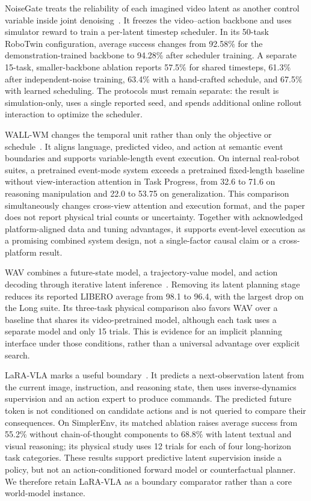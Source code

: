 NoiseGate treats the reliability of each imagined video latent as another control variable inside joint denoising~\cite{huang2026noisegate}. It freezes the video--action backbone and uses simulator reward to train a per-latent timestep scheduler. In its 50-task RoboTwin configuration, average success changes from 92.58\% for the demonstration-trained backbone to 94.28\% after scheduler training. A separate 15-task, smaller-backbone ablation reports 57.5\% for shared timesteps, 61.3\% after independent-noise training, 63.4\% with a hand-crafted schedule, and 67.5\% with learned scheduling. The protocols must remain separate: the result is simulation-only, uses a single reported seed, and spends additional online rollout interaction to optimize the scheduler.

WALL-WM changes the temporal unit rather than only the objective or schedule~\cite{li2026wallwm}. It aligns language, predicted video, and action at semantic event boundaries and supports variable-length event execution. On internal real-robot suites, a pretrained event-mode system exceeds a pretrained fixed-length baseline without view-interaction attention in Task Progress, from 32.6 to 71.6 on reasoning manipulation and 22.0 to 53.75 on generalization. This comparison simultaneously changes cross-view attention and execution format, and the paper does not report physical trial counts or uncertainty. Together with acknowledged platform-aligned data and tuning advantages, it supports event-level execution as a promising combined system design, not a single-factor causal claim or a cross-platform result.

WAV combines a future-state model, a trajectory-value model, and action decoding through iterative latent inference~\cite{li2026wav}. Removing its latent planning stage reduces its reported LIBERO average from 98.1 to 96.4, with the largest drop on the Long suite. Its three-task physical comparison also favors WAV over a baseline that shares its video-pretrained model, although each task uses a separate model and only 15 trials. This is evidence for an implicit planning interface under those conditions, rather than a universal advantage over explicit search.

LaRA-VLA marks a useful boundary~\cite{bai2026laravla}. It predicts a next-observation latent from the current image, instruction, and reasoning state, then uses inverse-dynamics supervision and an action expert to produce commands. The predicted future token is not conditioned on candidate actions and is not queried to compare their consequences. On SimplerEnv, its matched ablation raises average success from 55.2\% without chain-of-thought components to 68.8\% with latent textual and visual reasoning; its physical study uses 12 trials for each of four long-horizon task categories. These results support predictive latent supervision inside a policy, but not an action-conditioned forward model or counterfactual planner. We therefore retain LaRA-VLA as a boundary comparator rather than a core world-model instance.

